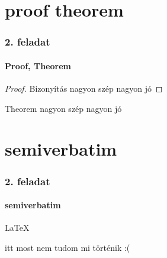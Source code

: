 \documentclass[12pt,aspectratoio=169]{beamer}
\begin{document}
\section{proof theorem}
\begin{frame}
\frametitle{2. feladat}
\framesubtitle{Proof, Theorem}

\begin{proof}
Bizonyítás nagyon szép nagyon jó
\end{proof}
\begin{theorem}
Theorem nagyon szép nagyon jó
\end{theorem}
\end{frame}

\section{semiverbatim}
\begin{frame}
\frametitle{2. feladat}
\framesubtitle{semiverbatim}
\begin{semiverbatim}
\LaTeX

itt most nem tudom mi történik :(
\end{semiverbatim}
\end{frame}
\end{document}
